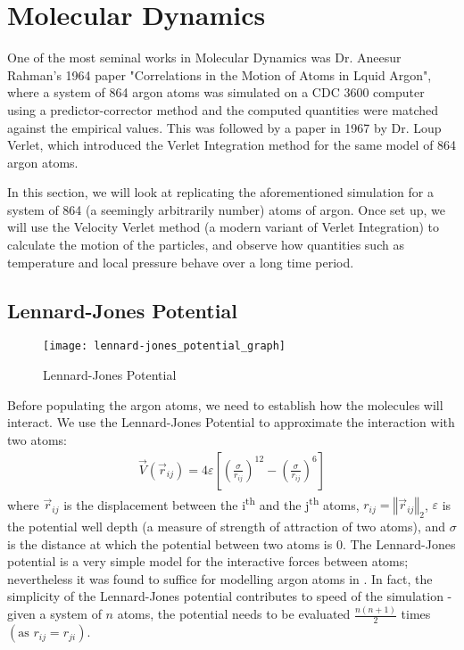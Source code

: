 \documentclass[../Main.tex]{subfiles}
\begin{document}
\section{Molecular Dynamics}

One of the most seminal works in Molecular Dynamics was Dr. Aneesur Rahman's 1964 paper \cite{Rahman1964} "Correlations in the Motion of Atoms in Lquid Argon", where a system of 864 argon atoms was simulated on a CDC 3600 computer using a predictor-corrector method and the computed quantities were matched against the empirical values. This was followed by a paper in 1967 \cite{Verlet1967} by Dr. Loup Verlet, which introduced the Verlet Integration method for the same model of 864 argon atoms.

In this section, we will look at replicating the aforementioned simulation for a system of 864 (a seemingly arbitrarily number) atoms of argon. Once set up, we will use the Velocity Verlet method (a modern variant of Verlet Integration) to calculate the motion of the particles, and observe how quantities such as temperature and local pressure behave over a long time period.

\subsection{Lennard-Jones Potential}

\begin{wrapfigure}{r}{0.5\textwidth}
\centering
\texttt{[image: lennard-jones\_potential\_graph]}
\caption{Lennard-Jones Potential}
\label{fig:lennard-jones_potential}
\end{wrapfigure}

Before populating the argon atoms, we need to establish how the molecules will interact. We use the Lennard-Jones Potential to approximate the interaction with two atoms:
\begin{align}
	\vec{V}\left(\vec{r}_{ij}\right) = 4\varepsilon \left[ \left( \frac{\sigma}{r_{ij}}\right)^{12} - \left( \frac{\sigma}{r_{ij}}\right)^6 \right] \label{eqn:lennard-jones_potential}
\end{align}
where $\vec{r}_{ij}$ is the displacement between the i\textsuperscript{th} and the j\textsuperscript{th} atoms, $r_{ij} = \left\Vert\vec{r}_{ij}\right\Vert_{2}$, $\varepsilon$ is the potential well depth (a measure of strength of attraction of two atoms), and $\sigma$ is the distance at which the potential between two atoms is 0. The Lennard-Jones potential is a very simple model for the interactive forces between atoms; nevertheless it was found to suffice for modelling argon atoms in \cite{Rahman1964}. In fact, the simplicity of the Lennard-Jones potential contributes to speed of the simulation - given a system of $n$ atoms, the potential needs to be evaluated $\frac{n\left(n+1\right)}{2}$ times $\left(\mbox{as }r_{ij} = r_{ji}\right)$.
\end{document}

